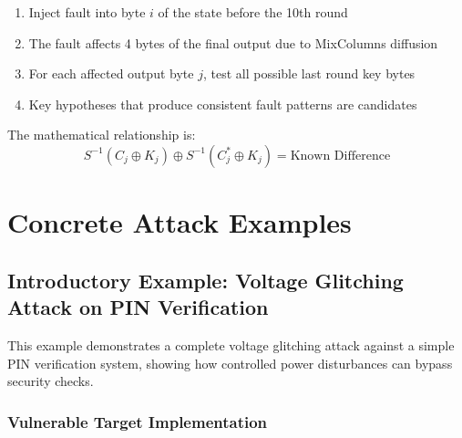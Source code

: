 \documentclass[12pt,a4paper]{article}
\begin{document}
\begin{enumerate}
    \item Inject fault into byte $i$ of the state before the 10th round
    \item The fault affects 4 bytes of the final output due to MixColumns diffusion
    \item For each affected output byte $j$, test all possible last round key bytes
    \item Key hypotheses that produce consistent fault patterns are candidates
\end{enumerate}

The mathematical relationship is:
\begin{equation}
S^{-1}(C_j \oplus K_j) \oplus S^{-1}(C^*_j \oplus K_j) = \text{Known Difference}
\end{equation}

\section{Concrete Attack Examples}

\subsection{Introductory Example: Voltage Glitching Attack on PIN Verification}

This example demonstrates a complete voltage glitching attack against a simple PIN verification system, showing how controlled power disturbances can bypass security checks.

\subsubsection{Vulnerable Target Implementation}
\end{document}
